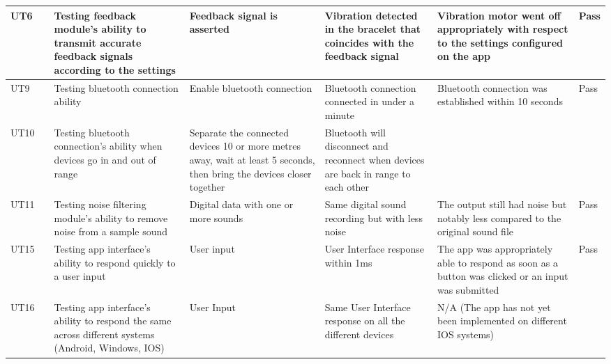 \documentclass[12pt, titlepage]{article}
\begin{document}
\begin{longtable}{|p{1.4cm}|p{1cm}|p{3cm}|p{1.5cm}|p{2.5cm}|p{2cm}|p{1.2cm}|}
  UT6       &      & Testing feedback module's ability to transmit accurate feedback signals according to the settings  & Feedback signal is asserted              & Vibration detected in the bracelet that coincides with the feedback signal                          &      Vibration motor went off appropriately with respect to the settings configured on the app                        &   {\color[HTML]{32CB00} Pass}                    \\ \hline
  UT9       &      & Testing bluetooth connection ability                                     & Enable bluetooth connection                                  & Bluetooth connection connected in under a minute                    &         Bluetooth connection was established within 10 seconds               &             {\color[HTML]{32CB00} Pass}                                       \\ \hline
  UT10      &      & Testing bluetooth connection's ability when devices go in and out of range                                      & Separate the connected devices 10 or more metres away, wait at least 5 seconds, then bring the devices closer together                                  & Bluetooth will disconnect and reconnect when devices are back in range to each other                    &                      &                                                   \\ \hline
  UT11      &      & Testing noise filtering module's ability to remove noise from a sample sound                                      & Digital data with one or more sounds                                  & Same digital sound recording but with less noise                    &          The output still had noise but notably less compared to the original sound file              &                    {\color[HTML]{32CB00} Pass}                                \\ \hline
  UT15      &      & Testing app interface's ability to respond quickly to a user input                                      & User input                                  & User Interface response within 1ms                    &         The app was appropriately able to respond as soon as a button was clicked or an input was submitted               &                {\color[HTML]{32CB00} Pass}                                    \\ \hline
  UT16      &      & Testing app interface's ability to respond the same across different systems (Android, Windows, IOS)                                      & User Input                                  & Same User Interface response on all the different devices                    &        N/A (The app has not yet been implemented on different IOS systems)                &                  \cellcolor[HTML]{FFFFFF}{\color[HTML]{F8A102} N/A}                                  \\ \hline
\end{longtable}
\end{document}
